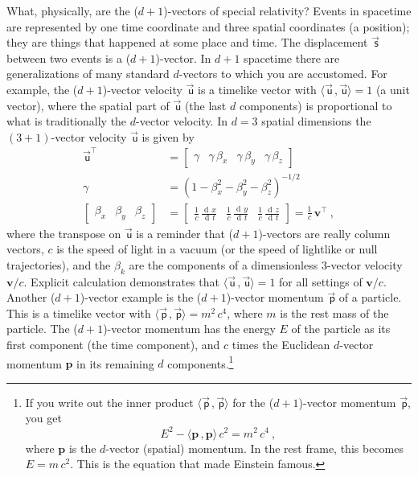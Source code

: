 \documentclass{article}
\DeclareMathOperator{\dd}{d\!}
\newcommand\upvec[1]{\!\vec{\,\mathrm{#1}}}
\newcommand{\Evec}[1]{{\mathbf{#1}}} %
\newcommand{\Lvec}[1]{\upvec{\mathsf{#1}}} %
\newcommand{\inner}[2]{\langle{#1}\,,{#2}\rangle}
\newcommand{\plus}{\!+\!} %
\begin{document}
What, physically, are the ($d\plus1$)-vectors of special relativity?
Events in spacetime are represented by one time coordinate and three spatial coordinates (a position); they are things that happened at some place and time.
The displacement $\Lvec{s}$ between two events is a ($d\plus1$)-vector.
In $d\plus1$ spacetime there are generalizations of many standard $d$-vectors to which you are accustomed.
For example,
the ($d\plus1$)-vector velocity $\Lvec{u}$ is a timelike vector with $\inner{\Lvec{u}}{\Lvec{u}}=1$ (a unit vector), where the spatial part of $\Lvec{u}$ (the last $d$ components) is proportional to what is traditionally the $d$-vector velocity.
In $d=3$ spatial dimensions the $(3\plus1)$-vector velocity $\Lvec{u}$ is given by
\begin{align}
    \Lvec{u}^\top &= \begin{bmatrix} \gamma & \gamma\,\beta_x & \gamma\,\beta_y & \gamma\,\beta_z \end{bmatrix} \\
    \gamma &= (1 - \beta_x^2 - \beta_y^2 - \beta_z^2)^{-1/2} \nonumber\\
    \begin{bmatrix} \beta_x & \beta_y & \beta_z\end{bmatrix} &= \begin{bmatrix}\displaystyle\frac{1}{c}\,\frac{\dd x}{\dd t} & \displaystyle\frac{1}{c}\,\frac{\dd y}{\dd t} & \displaystyle\frac{1}{c}\,\frac{\dd z}{\dd t} \end{bmatrix} = \frac{1}{c}\,\Evec{v}^\top ~,\nonumber
\end{align}
where the transpose on $\Lvec{u}$ is a reminder that ($d\plus1$)-vectors are really column vectors,
$c$ is the speed of light in a vacuum (or the speed of lightlike or null trajectories),
and the $\beta_k$ are the components of a dimensionless 3-vector velocity $\Evec{v}/c$.
Explicit calculation demonstrates that $\inner{\Lvec{u}}{\Lvec{u}}=1$ for all settings of $\Evec{v}/c$.
Another ($d\plus1$)-vector example is the ($d\plus1$)-vector momentum $\Lvec{p}$ of a particle.
This is a timelike vector with $\inner{\Lvec{p}}{\Lvec{p}}=m^2\,c^4$, where $m$ is the rest mass of the particle.
The ($d\plus1$)-vector momentum has the energy $E$ of the particle as its first component (the time component), and $c$ times the Euclidean $d$-vector momentum $\Evec{p}$ in its remaining $d$ components.\footnote{%
If you write out the inner product $\inner{\Lvec{p}}{\Lvec{p}}$ for the ($d\plus1$)-vector momentum $\Lvec{p}$, you get $$E^2 - \inner{\Evec{p}}{\Evec{p}}\,c^2 = m^2\,c^4~,$$ where $\Evec{p}$ is the $d$-vector (spatial) momentum. In the rest frame, this becomes $E=m\,c^2$. This is the equation that made Einstein famous.}
\end{document}
